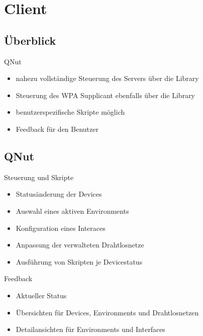 
\section{Client}
\subsection{Überblick}
\begin{frame}[<+-| alert@+>]{QNut}
	\begin{itemize}
		\item nahezu vollständige Steuerung des Servers über die Library
		\item Steuerung des WPA Supplicant ebenfalls über die Library
		\item benutzerspezifische Skripte möglich
		\item Feedback für den Benutzer
	\end{itemize}
\end{frame}

\subsection{QNut}
\begin{frame}[<+-| alert@+>]{Steuerung und Skripte}
	\begin{itemize}
		\item Statusänderung der Devices
		\item Auswahl eines aktiven Environments
		\item Konfiguration eines Interaces
		\item Anpassung der verwalteten Drahtlosnetze
		\item Ausführung von Skripten je Devicestatus
	\end{itemize}
\end{frame}

\begin{frame}[<+-| alert@+>]{Feedback}
	\begin{itemize}
		\item Aktueller Status
		\item Übersichten für Devices, Environments und Drahtlosnetzen
		\item Detailansichten für Environments und Interfaces
	\end{itemize}
\end{frame}
